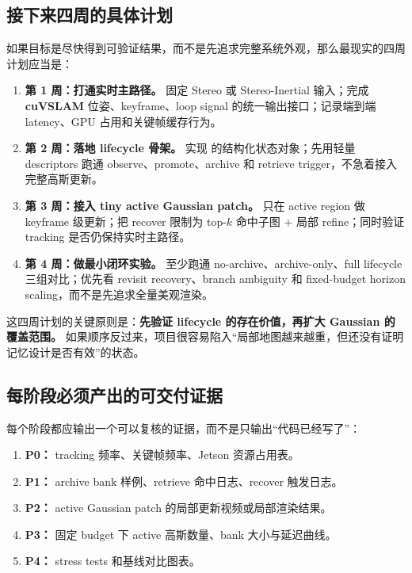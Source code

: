 \documentclass[12pt]{article}
\newcommand{\code}[1]{\texttt{\detokenize{#1}}}
\newcommand{\cuvslam}{\textbf{cuVSLAM}}
\begin{document}
\subsection{接下来四周的具体计划}

如果目标是尽快得到可验证结果，而不是先追求完整系统外观，那么最现实的四周计划应当是：
\begin{enumerate}
  \item \textbf{第 1 周：打通实时主路径。} 固定 Stereo 或 Stereo-Inertial 输入；完成 \cuvslam{} 位姿、keyframe、loop signal 的统一输出接口；记录端到端 latency、GPU 占用和关键帧缓存行为。
  \item \textbf{第 2 周：落地 lifecycle 骨架。} 实现 \code{M_short / M_active / B_bank} 的结构化状态对象；先用轻量 descriptors 跑通 observe、promote、archive 和 retrieve trigger，不急着接入完整高斯更新。
  \item \textbf{第 3 周：接入 tiny active Gaussian patch。} 只在 active region 做 keyframe 级更新；把 recover 限制为 top-$k$ 命中子图 + 局部 refine；同时验证 tracking 是否仍保持实时主路径。
  \item \textbf{第 4 周：做最小闭环实验。} 至少跑通 no-archive、archive-only、full lifecycle 三组对比；优先看 revisit recovery、branch ambiguity 和 fixed-budget horizon scaling，而不是先追求全量美观渲染。
\end{enumerate}

这四周计划的关键原则是：\textbf{先验证 lifecycle 的存在价值，再扩大 Gaussian 的覆盖范围。} 如果顺序反过来，项目很容易陷入“局部地图越来越重，但还没有证明记忆设计是否有效”的状态。

\subsection{每阶段必须产出的可交付证据}

每个阶段都应输出一个可以复核的证据，而不是只输出“代码已经写了”：
\begin{enumerate}
  \item \textbf{P0：} tracking 频率、关键帧频率、Jetson 资源占用表。
  \item \textbf{P1：} archive bank 样例、retrieve 命中日志、recover 触发日志。
  \item \textbf{P2：} active Gaussian patch 的局部更新视频或局部渲染结果。
  \item \textbf{P3：} 固定 budget 下 active 高斯数量、bank 大小与延迟曲线。
  \item \textbf{P4：} stress tests 和基线对比图表。
\end{enumerate}
\end{document}
